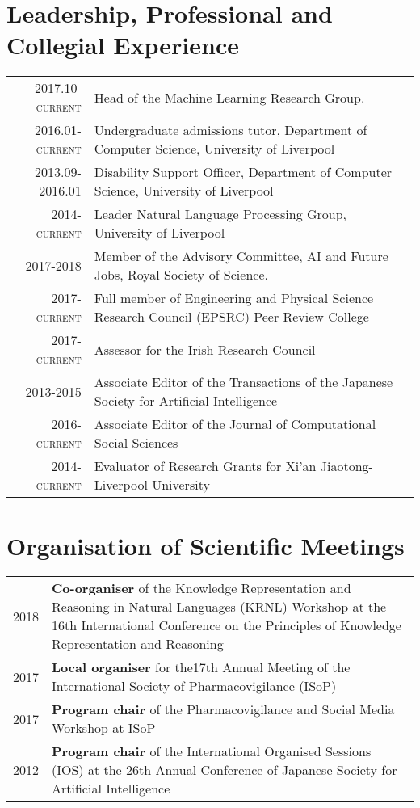 \documentclass[a4paper,11pt]{article}
\begin{document}
\section{Leadership, Professional and Collegial Experience}
\begin{tabular}{r p{11cm}}
\textsc{2017.10-current} & Head of the Machine Learning Research Group.\\
\textsc{2016.01-current} & Undergraduate admissions tutor, Department of Computer Science, University of Liverpool \\
\textsc{2013.09-2016.01} & Disability Support Officer, Department of Computer Science, University of Liverpool \\
\textsc{2014-current} & Leader Natural Language Processing Group, University of Liverpool\\
\textsc{2017-2018} & Member of the Advisory Committee, AI and Future Jobs, Royal Society of Science.\\
\textsc{2017-current} & Full member of Engineering and  Physical Science Research Council (EPSRC) Peer Review College \\
\textsc{2017-current} & Assessor for the Irish Research Council \\
\textsc{2013-2015} & Associate Editor of the Transactions of the Japanese Society for Artificial Intelligence\\
\textsc{2016-current} & Associate Editor of the Journal of Computational Social Sciences\\
\textsc{2014-current} & Evaluator of Research Grants for Xi'an Jiaotong-Liverpool University
\end{tabular}

\section{Organisation of Scientific Meetings}
\begin{tabular}{r p{13cm}}
\textsc{2018} & \textbf{Co-organiser} of the Knowledge Representation and Reasoning in Natural Languages (KRNL) Workshop at the 16th International Conference on the Principles of Knowledge Representation and Reasoning\\
\textsc{2017} & \textbf{Local organiser} for the17th Annual Meeting of the International Society of Pharmacovigilance (ISoP)\\
\textsc{2017} & \textbf{Program chair} of the Pharmacovigilance and Social Media Workshop at ISoP\\
\textsc{2012} & \textbf{Program chair} of the International Organised Sessions (IOS) at the 26th Annual Conference of Japanese Society for Artificial Intelligence
\end{tabular}
\end{document}
